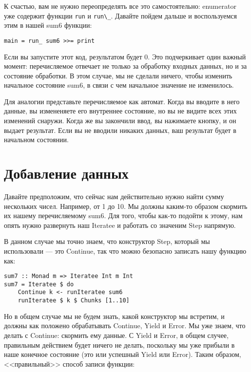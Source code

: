 К счастью, вам не нужно переопределять все это самостоятельно: enumerator уже содержит функции \lstinline'run' и \lstinline'run\_'. Давайте пойдем дальше и воспользуемся этим в нашей sum6 функции:

\begin{lstlisting}
main = run_ sum6 >>= print
\end{lstlisting}

Если вы запустите этот код, результатом будет 0. Это подчеркивает один важный момент: перечисляемое отвечает не только за обработку входных данных, но и за состояние обработки. В этом случае, мы не сделали ничего, чтобы изменить начальное состояние sum6, в связи с чем начальное значение не изменилось.

Для аналогии представьте перечисляемое как автомат. Когда вы вводите в него данные, вы измененяете его внутреннее состояние, но вы не видите всех этих изменений снаружи. Когда же вы закончили ввод, вы нажимаете кнопку, и он выдает результат. Если вы не вводили никаких данных, ваш результат будет в начальном состоянии.

\section{Добавление данных}

Давайте предположим, что сейчас нам действительно нужно найти сумму нескольких чисел. Например, от 1 до 10. Мы должны каким-то образом скормить их нашему перечисляемому sum6. Для того, чтобы как-то подойти к этому, нам опять нужно развернуть наш Iteratee и работать со значеним Step напрямую.

В данном случае мы точно знаем, что конструктор Step, который мы использовали --- это Continue, так что можно безопасно записать нашу функцию как:

\begin{lstlisting}
sum7 :: Monad m => Iteratee Int m Int
sum7 = Iteratee $ do
    Continue k <- runIteratee sum6
    runIteratee $ k $ Chunks [1..10]
\end{lstlisting}%

Но в общем случае мы не будем знать, какой конструктор мы встретим, и должны как положено обрабатывать Continue, Yield и Error. Мы уже знаем, что делать с Continue: скормить ему данные. С Yield и Error, в общем случее, правильным действием будет ничего не делать, поскольку мы уже прибыли в наше конечное состояние (это или успешный Yield или Error). Таким образом, <<правильный>> способ записи функции:

